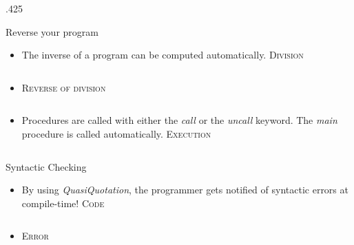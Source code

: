 \documentclass[final,hyperref={pdfpagelabels=false}]{beamer}
\newcommand\colsize{.425\textwidth}
\newcommand{\code}[1]{\inputminted[frame=lines,framesep=1cm,baselinestretch=.9,linenos,fontsize=\scriptsize]{haskell}{code/#1.hs}}
\newcommand{\codeErr}[1]{\inputminted[frame=lines,framesep=1cm,baselinestretch=.9,fontsize=\scriptsize]{bash}{code/#1_err.hs}}
\begin{document}
\begin{frame}[t]
\begin{columns}[t]
\begin{column}{\colsize}
\begin{block}{Reverse your program}
\begin{itemize}
		\item The inverse of a program can be computed automatically.
		\center
		\textsc{\small Division}\\ \vspace{1cm}
		\begin{minipage}{.8\textwidth}
		\code{divide}
		\end{minipage}
		\vspace{1cm}
		\item \textsc{\small Reverse of division}\\ \vspace{1cm}
		\begin{minipage}{.8\textwidth}
		\code{divide_reverse}
		\end{minipage}
	\end{itemize}
	\begin{itemize}
\item Procedures are called with either the \textit{call} or the \textit{uncall} keyword. The \textit{main} procedure is called automatically. 	
		\center
		\textsc{\small Execution}\\ \vspace{1cm}
		\begin{minipage}{.8\textwidth}
		\code{call_uncall}
		\end{minipage}
		\end{itemize}
\end{block}

\begin{block}{Syntactic Checking}
	\begin{itemize}
		\item By using \textit{QuasiQuotation}, the programmer gets notified of syntactic errors at compile-time!
	\center
	\textsc{\small Code}\\ \vspace{1cm}
	\begin{minipage}{.8\textwidth}
	\code{syntax}
	\end{minipage}
	\vspace{1cm}
	\item \textsc{\small Error}\\ \vspace{1cm}
	\begin{minipage}{.8\textwidth}
	\codeErr{syntax}
	\end{minipage}
	\end{itemize}
\end{block}



\end{column}
\end{columns}
\end{frame}
\end{document}
